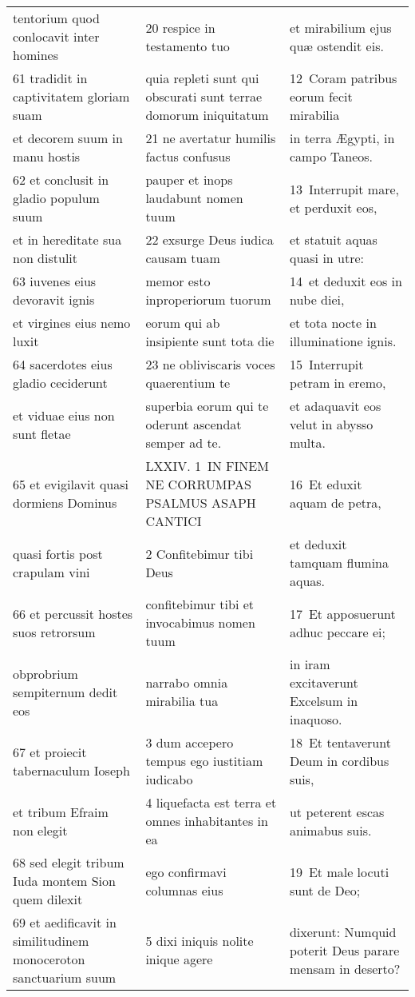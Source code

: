 \documentclass{article}
\begin{document}
\begin{longtable}{@{}p{}p{}p{}@{}}
tentorium quod conlocavit inter homines	&	20 respice in testamento tuo	&	et mirabilium ejus quæ ostendit eis.	\\
61 tradidit in captivitatem gloriam suam	&	quia repleti sunt qui obscurati sunt terrae domorum iniquitatum	&	12 Coram patribus eorum fecit mirabilia	\\
et decorem suum in manu hostis	&	21 ne avertatur humilis factus confusus	&	in terra Ægypti, in campo Taneos.	\\
62 et conclusit in gladio populum suum	&	pauper et inops laudabunt nomen tuum	&	13 Interrupit mare, et perduxit eos,	\\
et in hereditate sua non distulit	&	22 exsurge Deus iudica causam tuam	&	et statuit aquas quasi in utre:	\\
63 iuvenes eius devoravit ignis	&	memor esto inproperiorum tuorum	&	14 et deduxit eos in nube diei,	\\
et virgines eius nemo luxit	&	eorum qui ab insipiente sunt tota die	&	et tota nocte in illuminatione ignis.	\\
64 sacerdotes eius gladio ceciderunt	&	23 ne obliviscaris voces quaerentium te	&	15 Interrupit petram in eremo,	\\
et viduae eius non sunt fletae	&	superbia eorum qui te oderunt ascendat semper ad te.	&	et adaquavit eos velut in abysso multa.	\\
65 et evigilavit quasi dormiens Dominus	&	LXXIV. 1 IN FINEM NE CORRUMPAS PSALMUS ASAPH CANTICI	&	16 Et eduxit aquam de petra,	\\
quasi fortis post crapulam vini	&	2 Confitebimur tibi Deus	&	et deduxit tamquam flumina aquas.	\\
66 et percussit hostes suos retrorsum	&	confitebimur tibi et invocabimus nomen tuum	&	17 Et apposuerunt adhuc peccare ei;	\\
obprobrium sempiternum dedit eos	&	narrabo omnia mirabilia tua	&	in iram excitaverunt Excelsum in inaquoso.	\\
67 et proiecit tabernaculum Ioseph	&	3 dum accepero tempus ego iustitiam iudicabo	&	18 Et tentaverunt Deum in cordibus suis,	\\
et tribum Efraim non elegit	&	4 liquefacta est terra et omnes inhabitantes in ea	&	ut peterent escas animabus suis.	\\
68 sed elegit tribum Iuda montem Sion quem dilexit	&	ego confirmavi columnas eius	&	19 Et male locuti sunt de Deo;	\\
69 et aedificavit in similitudinem monoceroton sanctuarium suum	&	5 dixi iniquis nolite inique agere	&	dixerunt: Numquid poterit Deus parare mensam in deserto?	\\

\end{longtable}
\end{document}
